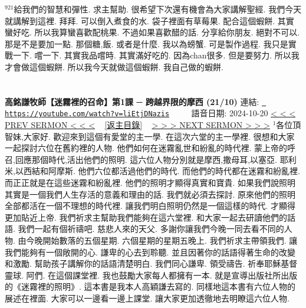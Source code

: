 \documentclass{book}
\begin{document}
$^{921}$給我們的智慧和彈性.
求主幫助.
很希望下次還有機會為大家講解聖經.
我們今天就講解到這裡.
拜拜.
可以倒入煮食的水.
袋子裡面有草莓果.
配合這個蝦餅.
其實蠻好吃.
所以我算蠻喜歡配桃果.
不過如果喜歡醋的話.
分享給你朋友.
絕對不可以.
那是不是要加一點.
那個糖,飯.
或者是什麼.
我以為螃蟹.
可是製作過程.
我只是實戰一下.
嚐一下.
其實我品嚐時.
其實滿好吃的.
因為chan很多.
但是要努力.
所以我才會做這個蝦餅.
所以我今天就做這個蝦餅.
我自己做的蝦餅.
\newpage



\section{}
\label{sec:liEtjDNazis}
\textbf{高銘謙牧師【迷霧裡的召命】第1課 ─ 跨越界限的摩西 (21/10)}
\newline
\newline
連結: \href{https://youtube.com/watch?v=liEtjDNazis}{\texttt{ https://youtube.com/watch?v=liEtjDNazis}} ~~~~ 語音日期: 2024-10-20 
\newline
\newline
\hyperref[sec:GvsPo_gDoyw]{\small{< < < PREV SERMON < < <}}
~
\hyperref[sec:index]{\small{[返主目錄]}}
~
\hyperref[sec:djNxJ0pc_CU]{\small{> > > NEXT SERMON > > >}}
\newline
\newline
$^{1}$各位頂智妹,大家好.
歡迎來到這個有愛堂的主一學.
在這次六堂的主一學裡.
很想和大家一起探討六位在舊約裡的人物.
他們如何在迷霧亂世和紛亂的時代裡.
蒙上帝的呼召,回應那個時代,活出他們的照明.
這六位人物分別就是摩西,撒母耳,以塞亞.
耶利米,以西結和阿摩斯.
他們六位都活過他們的時代.
而他們的時代都在迷霧和紛亂裡.
而正正就是在這些迷霧和紛亂裡.
他們的照明才顯得真實和寶貴.
如果我們說照明其實是一個我們人生存活的意義和理由的話.
我們就必須去探討.
原來他們的照明全部都活在一個不理想的時代裡.
讓我們明白照明仍然是一個這樣的時代.
才顯得更加貼近上帝.
我們祈求主幫助我們能夠在這六堂裡.
和大家一起去研讀他們的話語.
我們一起有個祈禱吧.
慈悲人來的天父.
多謝你讓我們今晚一同去看不同的人物.
由今晚開始數落的五個星期.
六個星期的星期五晚上.
我們祈求主帶領我們.
讓我們能夠有一個敞開的心.
謙卑的心去到聆聽.
並且因著你的話語得著生命的改變和激勵.
幫助孩子講解你的話語清楚明白.
我們同心謙卑.
領受禱告.
祈奉耶穌基督靈球.
阿們.
在這個課堂裡.
我也鼓勵大家每人都擁有一本.
就是宣導出版社所出版的《迷霧裡的照明》.
這本書是我本人高穎謙去寫的.
同樣地這本書有六位人物的展述在裡面.
大家可以一邊看一邊上課堂.
讓大家更加透徹地去明瞭這六位人物.
\end{document}
